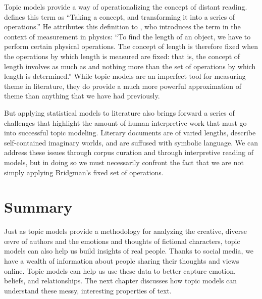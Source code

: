 Topic models provide a way of operationalizing the concept of distant reading.
\citet{moretti2013operationalizing} defines this term as ``Taking a concept, and transforming it into a series of operations.''
He attributes this definition to \citet{bridgman1927logic},  who introduces the term in the context of measurement in physics: ``To find the length of an object, we have to perform certain physical operations. The concept of length is therefore fixed when the operations by which length is measured are fixed: that is, the concept of length involves as much as and nothing more than the set of operations by which length is determined.''
While topic models are an imperfect tool for measuring theme in literature, they do provide a much more powerful approximation of theme than anything that we have had previously.

But applying statistical models to literature also brings forward a series of challenges that highlight the amount of human interpretive work that must go into successful topic modeling.
Literary documents are of varied lengths, describe self-contained imaginary worlds, and are suffused with symbolic language.
We can address these issues through corpus curation and through interpretive reading of models, but in doing so we must necessarily confront the fact that we are not simply applying Bridgman's fixed set of operations.

\section{Summary}

Just as topic models provide a methodology for analyzing the creative, diverse \oe{}vre of authors and the emotions and thoughts of fictional characters, topic models can also help us build insights of real people.
Thanks to social media, we have a wealth of information about people sharing their thoughts and views online.  Topic models can help us use these data to better capture emotion,
beliefs, and relationships.  The next chapter discusses how topic models can
understand these messy, interesting properties of text.
